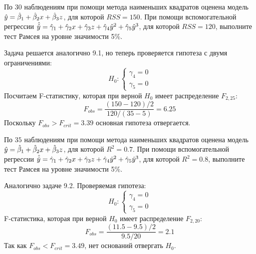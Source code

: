 \begin{problem}
По $30$ наблюдениям при помощи метода наименьших квадратов оценена
модель $\hat{y}=\hat{\beta}_1+\hat{\beta}_2 x +\hat{\beta}_3 z$, для которой $RSS = 150$. При помощи вспомогательной регрессии $\hat{\hat{y}}=\hat{\gamma}_1+\hat{\gamma}_2 x +\hat{\gamma}_3 z+\hat{\gamma}_4 \hat{y}^2+\hat{\gamma}_5 \hat{y}^3$, для которой $RSS = 120$, выполните тест Рамсея на уровне значимости 5\%.

\begin{sol}
Задача решается аналогично 9.1, но теперь проверяется гипотеза с двумя ограничениями:
\[
H_0:
\begin{cases}
\gamma_4 = 0 \\
\gamma_5 = 0
\end{cases}
\]
Посчитаем F-статистику, которая при верной $H_0$ имеет распределение $F_{2, 25}$:
\[
F_{obs} = \frac{(150-120)/2}{120/(35-5)} = 6.25
\]
Поскольку $F_{obs} > F_{crit} = 3.39$ основная гипотеза отвергается.
\end{sol}
\end{problem}


\begin{problem}
По $35$ наблюдениям при помощи метода наименьших квадратов оценена
модель $\hat{y}=\hat{\beta}_1+\hat{\beta}_2 x +\hat{\beta}_3 z$, для которой $R^2 = 0.7$. 
При помощи вспомогательной регрессии $\hat{\hat{y}}=\hat{\gamma}_1+\hat{\gamma}_2 x +\hat{\gamma}_3 z+\hat{\gamma}_4 \hat{y}^2+\hat{\gamma}_5 \hat{y}^3$, 
для которой $R^2 = 0.8$, выполните тест Рамсея на уровне значимости 5\%.


\begin{sol}
Аналогично задаче 9.2. Проверяемая гипотеза:
\[
H_0:
\begin{cases}
\gamma_4 = 0 \\
\gamma_5 = 0
\end{cases}
\]
F-статистика, которая при верной $H_0$ имеет распределение $F_{2, 20}$:
\[
F_{obs} = \frac{(11.5-9.5)/2}{9.5/20} = 2.1
\]
Так как $F_{obs} < F_{crit} = 3.49$, нет оснований отвергать $H_0$.
\end{sol}
\end{problem}

%


